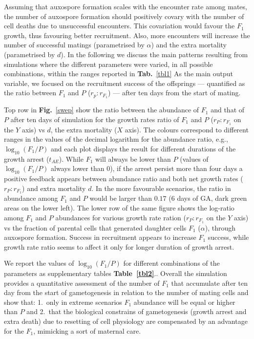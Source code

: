 \documentclass[a4paper,oneside]{article}
\begin{document}
    Assuming that auxospore formation scales with the encounter rate among mates, the number of auxospore formation should positively covary with the number of cell deaths due to unsuccessful encounters.
    This covariation would favour the $F_{1}$ growth, thus favouring better recruitment.
    Also, more encounters will increase the number of successful matings (parametrised by $\alpha$) and the extra mortality (parametrised by $d$).
    In the following we discuss the main patterns resulting from simulations where the different parameters were varied, in all possible combinations, within the ranges reported in \textbf{Tab.}~\ref{tbl1}
    As the main output variable, we focused on the recruitment success of the offsprings --- quantified as the ratio between $F_{1}$ and $P$ ($r_p : r_{F_{1}}$) --- after ten days from the start of mating.

    Top row in \textbf{Fig.}~\ref{swep} show the ratio between the abundance of $F_{1}$ and that of $P$ after ten days of simulation for the growth rates ratio of $F_{1}$ and $P$ ($r_P : r_{F_{1}}$ on the $Y$ axis) vs $d$, the extra mortality ($X$ axis).
    The colours correspond to different ranges in the values of the decimal logarithm for the abundance ratio, e.g., $\log_{10}(F_{1}/P)$ and each plot displays the result for different durations of the growth arrest ($t_{AE}$).
    While $F_{1}$ will always be lower than $P$ (values of $\log_{10}(F_{1}/P)$ always lower than $0$), if the arrest persist more than four days a positive feedback appears between  abundance ratio and both net growth rates ($r_P : r_{F_{1}}$) and extra mortality $d$.
    In the more favourable scenarios, the ratio in abundance among $F_{1}$ and $P$ would be larger than $0.17$ (6 days of GA, dark green areas on the lower left).
    The lower row of the same figure shows the log-ratio among $F_{1}$ and $P$ abundances for various growth rate ration ($r_P : r_{F_{1}}$ on the $Y$ axis) vs the fraction of parental cells that generated daughter cells $F_{1}$ ($\alpha$), through auxospore formation.
    Success in recruitment appears to increase $F_{1}$ success, while growth rate ratio seems to affect it only for longer duration of growth arrest.

    We report the values of $\log_{10}(F_{1}/P)$ for different combinations of the parameters as supplementary tables \textbf{Table~\ref{tbl2}}..
    Overall the simulation provides a quantitative assessment of the number of $F_{1}$ that accumulate after ten day from the start of gametogenesis in relation to the number of mating cells and show that:
    1.\ only in extreme scenarios $F_{1}$ abundance will be equal or higher than $P$ and
    2.\ that the biological constrains of gametogenesis (growth arrest and extra death) due to resetting of cell physiology are compensated by an advantage for the $F_{1}$, mimicking a sort of maternal care.
\end{document}
